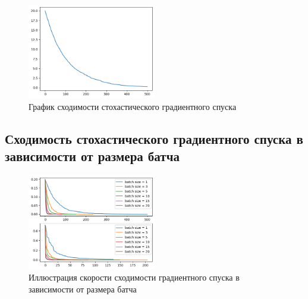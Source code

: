 \documentclass[a4paper,14pt,oneside,openany]{memoir}
\begin{document}
\begin{figure}[ht]
	\centering
	\includegraphics[width=0.5\textwidth]{img/1_1.png}
    \caption{График сходимости стохастического градиентного спуска}
\end{figure}

\newpage

\subsection{Сходимость стохастического градиентного спуска в зависимости от размера батча}

\begin{figure}[ht]
	\centering
	\includegraphics[width=0.5\textwidth]{img/1_2.png}
    \caption{Иллюстрация скорости сходимости градиентного спуска в зависимости от размера батча}
\end{figure}

\begin{table}[ht]
	\centering
    \caption{Таблица зависимости средней скорости сходимости функций в зависимости от размера батча}
\end{table}
\end{document}
